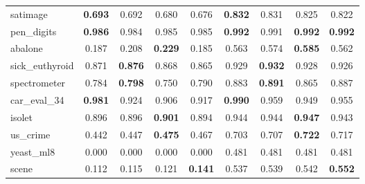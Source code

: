 \begin{figure}[ht]
\begin{tabular}{p{22mm}|*4{p{14mm}}|*4{p{14mm}}}
        satimage&\multicolumn{1}{c}{\textbf{0.693}}&\multicolumn{1}{c}{0.692}&\multicolumn{1}{c}{0.680}&\multicolumn{1}{c|}{0.676}&\multicolumn{1}{c}{\textbf{0.832}}&\multicolumn{1}{c}{0.831}&\multicolumn{1}{c}{0.825}&\multicolumn{1}{c}{0.822}\\
        pen\_digits&\multicolumn{1}{c}{\textbf{0.986}}&\multicolumn{1}{c}{0.984}&\multicolumn{1}{c}{0.985}&\multicolumn{1}{c|}{0.985}&\multicolumn{1}{c}{\textbf{0.992}}&\multicolumn{1}{c}{0.991}&\multicolumn{1}{c}{\textbf{0.992}}&\multicolumn{1}{c}{\textbf{0.992}}\\
        abalone&\multicolumn{1}{c}{0.187}&\multicolumn{1}{c}{0.208}&\multicolumn{1}{c}{\textbf{0.229}}&\multicolumn{1}{c|}{0.185}&\multicolumn{1}{c}{0.563}&\multicolumn{1}{c}{0.574}&\multicolumn{1}{c}{\textbf{0.585}}&\multicolumn{1}{c}{0.562}\\
        sick\_euthyroid&\multicolumn{1}{c}{0.871}&\multicolumn{1}{c}{\textbf{0.876}}&\multicolumn{1}{c}{0.868}&\multicolumn{1}{c|}{0.865}&\multicolumn{1}{c}{0.929}&\multicolumn{1}{c}{\textbf{0.932}}&\multicolumn{1}{c}{0.928}&\multicolumn{1}{c}{0.926}\\
        spectrometer&\multicolumn{1}{c}{0.784}&\multicolumn{1}{c}{\textbf{0.798}}&\multicolumn{1}{c}{0.750}&\multicolumn{1}{c|}{0.790}&\multicolumn{1}{c}{0.883}&\multicolumn{1}{c}{\textbf{0.891}}&\multicolumn{1}{c}{0.865}&\multicolumn{1}{c}{0.887}\\
        car\_eval\_34&\multicolumn{1}{c}{\textbf{0.981}}&\multicolumn{1}{c}{0.924}&\multicolumn{1}{c}{0.906}&\multicolumn{1}{c|}{0.917}&\multicolumn{1}{c}{\textbf{0.990}}&\multicolumn{1}{c}{0.959}&\multicolumn{1}{c}{0.949}&\multicolumn{1}{c}{0.955}\\
        isolet&\multicolumn{1}{c}{0.896}&\multicolumn{1}{c}{0.896}&\multicolumn{1}{c}{\textbf{0.901}}&\multicolumn{1}{c|}{0.894}&\multicolumn{1}{c}{0.944}&\multicolumn{1}{c}{0.944}&\multicolumn{1}{c}{\textbf{0.947}}&\multicolumn{1}{c}{0.943}\\
        us\_crime&\multicolumn{1}{c}{0.442}&\multicolumn{1}{c}{0.447}&\multicolumn{1}{c}{\textbf{0.475}}&\multicolumn{1}{c|}{0.467}&\multicolumn{1}{c}{0.703}&\multicolumn{1}{c}{0.707}&\multicolumn{1}{c}{\textbf{0.722}}&\multicolumn{1}{c}{0.717}\\
        yeast\_ml8&\multicolumn{1}{c}{0.000}&\multicolumn{1}{c}{0.000}&\multicolumn{1}{c}{0.000}&\multicolumn{1}{c|}{0.000}&\multicolumn{1}{c}{0.481}&\multicolumn{1}{c}{0.481}&\multicolumn{1}{c}{0.481}&\multicolumn{1}{c}{0.481}\\
        scene&\multicolumn{1}{c}{0.112}&\multicolumn{1}{c}{0.115}&\multicolumn{1}{c}{0.121}&\multicolumn{1}{c|}{\textbf{0.141}}&\multicolumn{1}{c}{0.537}&\multicolumn{1}{c}{0.539}&\multicolumn{1}{c}{0.542}&\multicolumn{1}{c}{\textbf{0.552}}\\

\end{tabular}
\end{figure}

